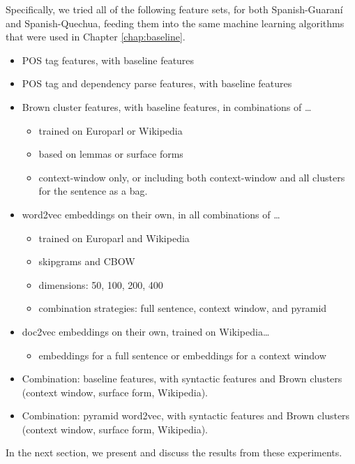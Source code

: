 Specifically, we tried all of the following feature sets, for both
Spanish-Guaraní and Spanish-Quechua, feeding them into the same machine
learning algorithms that were used in Chapter \ref{chap:baseline}.

\begin{itemize}
  \item POS tag features, with baseline features
  \item POS tag and dependency parse features, with baseline features

  \item Brown cluster features, with baseline features, in combinations of
  \dots{}
    \begin{itemize}
      \item trained on Europarl or Wikipedia
      \item based on lemmas or surface forms
      \item context-window only, or including both context-window and all
      clusters for the sentence as a bag.
    \end{itemize}

  \item word2vec embeddings on their own, in all combinations of \dots{}
    \begin{itemize}
      \item trained on Europarl and Wikipedia
      \item skipgrams and CBOW
      \item dimensions: 50, 100, 200, 400
      \item combination strategies: full sentence, context window, and pyramid
    \end{itemize}

  \item doc2vec embeddings on their own, trained on Wikipedia\dots{}
    \begin{itemize}
      \item embeddings for a full sentence or embeddings for a context window
    \end{itemize}

  \item Combination: baseline features, with syntactic features and
  Brown clusters (context window, surface form, Wikipedia).
  \item Combination: pyramid word2vec, with syntactic features and Brown
  clusters (context window, surface form, Wikipedia).
\end{itemize}

In the next section, we present and discuss the results from these experiments.

